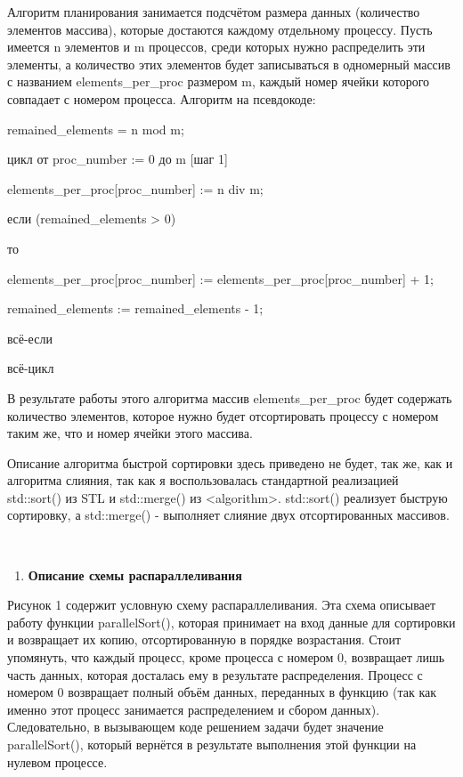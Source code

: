 \documentclass[]{article}
\begin{document}
Алгоритм планирования занимается подсчётом размера данных (количество
элементов массива), которые достаются каждому отдельному процессу. Пусть
имеется n элементов и m процессов, среди которых нужно распределить эти
элементы, а количество этих элементов будет записываться в одномерный
массив с названием elements\_per\_proc размером m, каждый номер ячейки
которого совпадает с номером процесса. Алгоритм на псевдокоде:

remained\_elements = n mod m;

цикл от proc\_number := 0 до m {[}шаг 1{]}

elements\_per\_proc{[}proc\_number{]} := n div m;

если (remained\_elements \textgreater{} 0)

то

elements\_per\_proc{[}proc\_number{]} :=
elements\_per\_proc{[}proc\_number{]} + 1;

remained\_elements := remained\_elements - 1;

всё-если

всё-цикл

В результате работы этого алгоритма массив elements\_per\_proc будет
содержать количество элементов, которое нужно будет отсортировать
процессу с номером таким же, что и номер ячейки этого массива.

Описание алгоритма быстрой сортировки здесь приведено не будет, так же,
как и алгоритма слияния, так как я воспользовалась стандартной
реализацией std::sort() из STL и std::merge() из
\textless{}algorithm\textgreater{}. std::sort() реализует быструю
сортировку, а std::merge() - выполняет слияние двух отсортированных
массивов.

\textbf{\\
}

\begin{enumerate}
\def\labelenumi{\arabic{enumi}.}
\setcounter{enumi}{1}
\item
  \textbf{Описание схемы распараллеливания}
\end{enumerate}

Рисунок 1 содержит условную схему распараллеливания. Эта схема описывает
работу функции parallelSort(), которая принимает на вход данные для
сортировки и возвращает их копию, отсортированную в порядке возрастания.
Стоит упомянуть, что каждый процесс, кроме процесса с номером 0,
возвращает лишь часть данных, которая досталась ему в результате
распределения. Процесс с номером 0 возвращает полный объём данных,
переданных в функцию (так как именно этот процесс занимается
распределением и сбором данных). Следовательно, в вызывающем коде
решением задачи будет значение parallelSort(), который вернётся в
результате выполнения этой функции на нулевом процессе.
\end{document}
